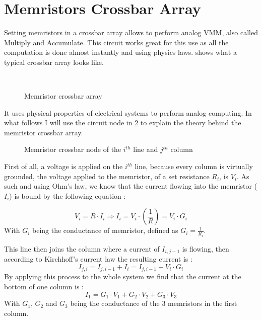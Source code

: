 \section{Memristors Crossbar Array}\label{sec:crossbar}

Setting memristors in a crossbar array allows to perform analog \ac{VMM}, also called Multiply and Accumulate. This circuit works great for this use as all the computation is done almost instantly and using physics laws.  shows what a typical crossbar array looks like.

\begin{figure}[H]
  \centering
  \hfill
  \\
  \caption{Memristor crossbar array}
  \label{fig:crossbar}
\end{figure}

It uses physical properties of electrical systems to perform analog computing. In what follows I will use the circuit node in \cref{fig:crossNode} to explain the theory behind the memristor crossbar array.
\begin{figure}[H]
  \centering
  
  \caption{Memristor crossbar node of the $i^{th}$ line and $j^{th}$ column}
  \label{fig:crossNode}
\end{figure}

First of all, a voltage is applied on the $i^{th}$ line, because every column is virtually grounded, the voltage applied to the memristor, of a set resistance $R_i$, is $V_i$. As such and using Ohm's law, we know that the current flowing into the memristor ($I_{i}$) is bound by the following equation :

\begin{equation}
  V_i = R\cdot I_{i} \Rightarrow I_{i} = V_i\cdot (\frac{1}{R})= V_i\cdot G_i
\end{equation}
With $G_i$ being the conductance of memristor, defined as $ G_i=\frac{1}{R_i}$.

This line then joins the column where a current of $I_{i,j-1}$ is flowing, then according to Kirchhoff's current law the resulting current is :
\begin{equation}
  I_{j,i} = I_{j,i-1}+I_{i} = I_{j,i-1} + V_i\cdot G_i
\end{equation}
By applying this process to the whole system we find that the current at the bottom of one column is :
\begin{equation}
  I_1= G_1\cdot V_1 +  G_2\cdot V_2 +  G_3\cdot V_3
\end{equation}
With $G_1$, $G_2$ and $G_3$ being the conductance of the 3 memristors in the first column.

